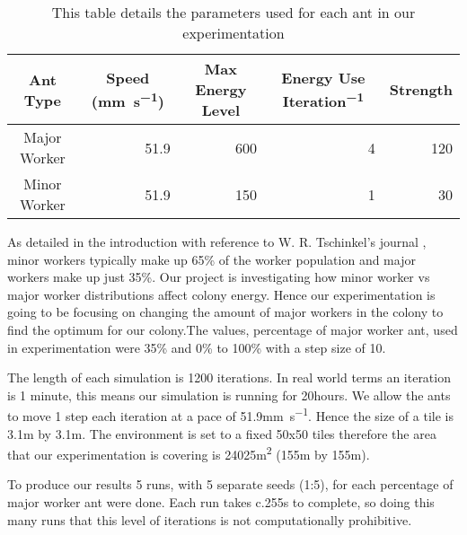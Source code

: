 \begin{table}[htb]
  \centering
  \caption{This table details the parameters used for each ant in our experimentation}
  \label{tab:ant-parameters}
  \begin{tabular}{@{}crrrr@{}}
  \toprule
  Ant Type     & \multicolumn{1}{c}{Speed (\si{mm.s^{-1}})} & \multicolumn{1}{c}{Max Energy Level} & \multicolumn{1}{c}{Energy Use \si{Iteration^{-1}}} & \multicolumn{1}{c}{Strength} \\ \midrule
  Major Worker & 51.9                             &  600                                    & 4     & 120                                    \\ \midrule
  Minor Worker & 51.9                              & 150                                     & 1    & 30                                     \\ \bottomrule
  \end{tabular}
\end{table}

As detailed in the introduction with reference to W. R. Tschinkel's journal \cite{Tschinkel1988}, minor workers typically make up 65\% of the worker population and major workers make up just 35\%. Our project is investigating how minor worker vs major worker distributions affect colony energy. Hence our experimentation is going to be focusing on changing the amount of major workers in the colony to find the optimum for our colony.The values, percentage of major worker ant, used in experimentation were 35\% and 0\% to 100\% with a step size of 10.\par
 The length of each simulation is 1200 iterations. In real world terms an iteration is 1 minute, this means our simulation is running for 20hours. We allow the ants to move 1 step each iteration at a pace of 51.9\si{mm.s^{-1}}. Hence the size of a tile is 3.1\si{m} by 3.1\si{m}. The environment is set to a fixed 50x50 tiles therefore the area that our experimentation is covering is 24025\si{m^2} (155\si{m} by 155\si{m}).\par
 To produce our results 5 runs, with 5 separate seeds (1:5), for each percentage of major worker ant were done. Each run takes c.255\si{s} to complete, so doing this many runs that this level of iterations is not computationally prohibitive.\par

